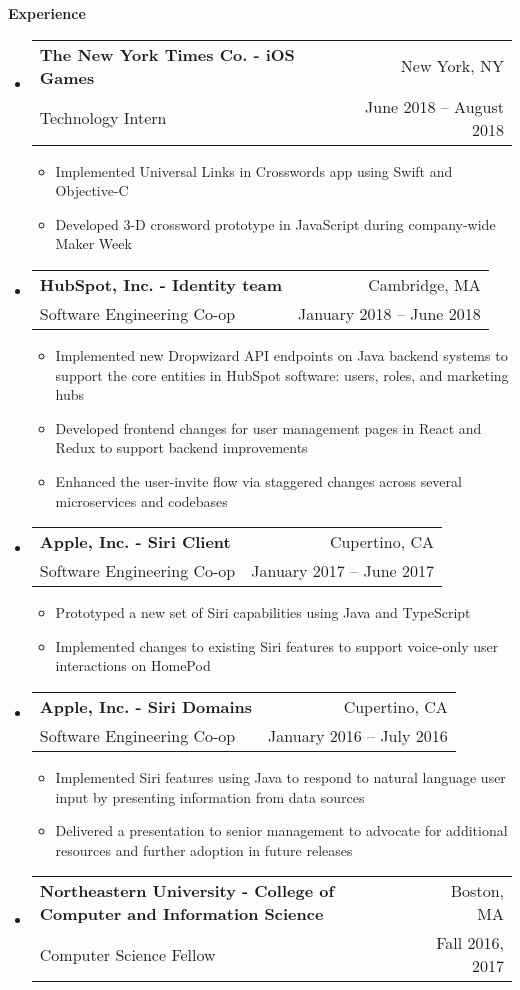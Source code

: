 \documentclass[letterpaper,10pt]{article}
\makeatletter
\newcommand{\resitem}[1]{\item #1 \vspace{-2pt}}
\newcommand{\resheading}[1]{{\large \colorbox{mygrey}{\begin{minipage}{\textwidth}{\textbf{#1 \vphantom{p\^{E}}}}\end{minipage}}}}
\newcommand{\ressubheading}[4]{
\begin{tabular*}{6.8in}{l@{\extracolsep{\fill}}r}
		\textbf{#1} & #2 \\
		\small{#3} & \small{#4} \\
\end{tabular*}\vspace{-6pt}}
\makeatother
\begin{document}
\resheading{Experience}
\begin{itemize}[leftmargin=*]
  \item[]
  \ressubheading{The New York Times Co. - \small{iOS Games}}{New York, NY}{Technology Intern}{June 2018 -- August 2018}
  {\footnotesize
    \begin{itemize}
	  \resitem{Implemented Universal Links in Crosswords app using Swift and Objective-C}
	  \resitem{Developed 3-D crossword prototype in JavaScript during company-wide Maker Week}
  \end{itemize}}
  \item[]
  \ressubheading{HubSpot, Inc. - \small{Identity team}}{Cambridge, MA}{Software Engineering Co-op}{January 2018 -- June 2018}
  {\footnotesize
    \begin{itemize}
      \resitem{Implemented new Dropwizard API endpoints on Java backend systems to support the core entities in HubSpot software: users, roles, and marketing hubs}
      \resitem{Developed frontend changes for user management pages in React and Redux to support backend improvements}
      \resitem{Enhanced the user-invite flow via staggered changes across several microservices and codebases}
  \end{itemize}}
	\item[]
	\ressubheading{Apple, Inc. - \small{Siri Client}}{Cupertino, CA}{Software Engineering Co-op}{January 2017 -- June 2017}
	{\footnotesize
		\begin{itemize}
			\resitem{Prototyped a new set of Siri capabilities using Java and TypeScript}
			\resitem{Implemented changes to existing Siri features to support voice-only user interactions on HomePod}
	\end{itemize}}
	\item[]
	\ressubheading{Apple, Inc. - \small{Siri Domains}}{Cupertino, CA}{Software Engineering Co-op}{January 2016 -- July 2016}
	{\footnotesize
		\begin{itemize}
			\resitem{Implemented Siri features using Java to respond to natural language user input by presenting information from data sources}
			\resitem{Delivered a presentation to senior management to advocate for additional resources and further adoption in future releases}
	\end{itemize}}
	\item[]
	\ressubheading{Northeastern University - \small{College of Computer and Information Science}}{Boston, MA}{Computer Science Fellow}{Fall 2016, 2017}
	{\footnotesize
		\begin{itemize}

\end{itemize}}
\end{itemize}
\end{document}
